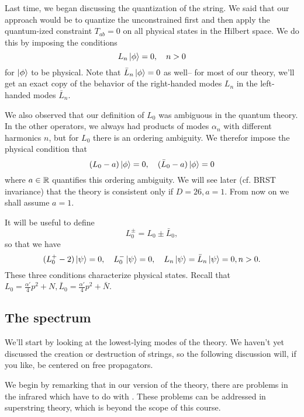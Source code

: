 Last time, we began discussing the quantization of the string. We said that our approach would be to quantize the unconstrained first and then apply the quantum-ized constraint $T_{ab}=0$ on all physical states in the Hilbert space. We do this by imposing the conditions
\begin{equation}
    L_n \left| \phi \right>=0, \quad n>0
\end{equation}
for $\left| \phi \right>$ to be physical. Note that $\bar L_n\left| \phi \right>=0$ as well-- for most of our theory, we'll get an exact copy of the behavior of the right-handed modes $L_n$ in the left-handed modes $\bar L_n$.

We also observed that our definition of $L_0$ was ambiguous in the quantum theory. In the other operators, we always had products of modes $\alpha_n$ with different harmonics $n$, but for $L_0$ there is an ordering ambiguity. We therefor impose the physical condition that
\begin{equation}
    (L_0-a)\left| \phi \right>=0, \quad (\bar L_0 -a)\left| \phi \right>=0
\end{equation}
where $a\in \mathbb{R}$ quantifies this ordering ambiguity. We will see later (cf. BRST invariance) that the theory is consistent only if $D=26,a=1$. From now on we shall assume $a=1$.

It will be useful to define
\begin{equation}
    L_0^\pm = L_0 \pm \bar L_0,
\end{equation}
so that we have
\begin{equation}
    (L_0^+ -2)\left| \psi \right>=0,\quad L_0^- \left| \psi \right> = 0, \quad L_n \left| \psi \right>=\bar L_n \left| \psi \right>=0, n>0.
\end{equation}
These three conditions characterize physical states. Recall that $L_0=\frac{\alpha'}{4} p^2 + N, \bar L_0=\frac{\alpha'}{4} p^2 + \bar N$.

\subsection*{The spectrum} We'll start by looking at the lowest-lying modes of the theory. We haven't yet discussed the creation or destruction of strings, so the following discussion will, if you like, be centered on free propagators.

We begin by remarking that in our version of the theory, there are problems in the infrared which have to do with . These problems can be addressed in superstring theory, which is beyond the scope of this course.

